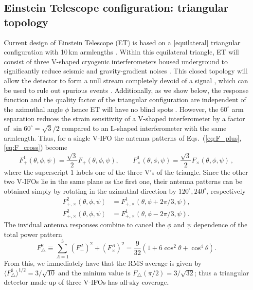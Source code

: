 \documentclass[prd,amsmath,amssymb,aps,floats,amsfonts,notitlepage,superscriptaddress,eqsecnum,nofootinbib,10pt]{revtex4-1}
\newcommand{\f}{\frac}
\newcommand{\be}{\begin{equation}}
\newcommand{\ee}{\end{equation}}
\begin{document}
\subsection{Einstein Telescope configuration: triangular topology}\label{sec:ET_topo}
Current design of Einstein Telescope (ET) is based on a [equilateral] triangular configuration with 10\,km armlengths \cite{ET_doc}.
Within this equilateral triangle, ET will consist of three V-shaped cryogenic interferometers housed underground to
significantly reduce seismic and gravity-gradient noises \cite{ET_doc}.
This closed topology will allow the detector to form a null stream completely devoid of a signal \cite{Sathyaprakash:2012jk},
which can be used to rule out spurious events \cite{Wen:2005ui}.
Additionally, as we show below, the response function and the quality factor of the triangular configuration are independent of the azimuthal angle $\phi$
hence ET will have no blind spots \cite{Regimbau:2012ir}.
However, the $60^\circ$ arm separation reduces the strain sensitivity of a V-shaped interferometer by a factor of $\sin 60^\circ=\sqrt{3}/2$ compared
to an L-shaped interferometer with the same armlength. Thus, for a single V-IFO the antenna patterns of Eqs.~(\ref{eq:F_plus}, \ref{eq:F_cross}) become
%
\be
F^1_+(\theta,\phi,\psi)= \f{\sqrt{3}}{2} F_+(\theta,\phi,\psi), \qquad F^1_\times(\theta,\phi,\psi)= \f{\sqrt{3}}{2} F_\times(\theta,\phi,\psi)\label{eq:F1plus_F1cross}\, ,
\ee
%
where the superscript $1$ labels one of the three V's of the triangle.
Since the other two V-IFOs lie in the same plane as the first one, their antenna patterns can be obtained simply by rotating in the azimuthal
direction by $120^\circ, 240^\circ$, respectively
%
\begin{align}
 F^2_{+,\times}(\theta,\phi,\psi) &= F^1_{+,\times}(\theta,\phi+2\pi/3,\psi), \label{eq:F2plus_F2cross}\\
 F^3_{+,\times}(\theta,\phi,\psi) &= F^1_{+,\times}(\theta,\phi-2\pi/3,\psi) \label{eq:F3plus_F3cross}.
\end{align}
%
The invidual antenna responses combine to cancel the $\phi$ and $\psi$ dependence of the total power pattern
%
\be
F^2_\bigtriangleup \equiv \sum_{A=1}^3 \left(F^A_+\right)^2+\left(F^A_\times\right)^2 = \f{9}{32}\left(1+6\cos^2\theta + \cos^4\theta\right). \label{eq:ET_power_pattern}
\ee
%
From this, we immediately have that the RMS average is given by $\langle F^2_\bigtriangleup\rangle^{1/2} =3/\sqrt{10}$ and the minium value is $F_\bigtriangleup(\pi/2)=3/\sqrt{32}$;
thus a triangular detector made-up of three V-IFOs has all-sky coverage.
\end{document}
